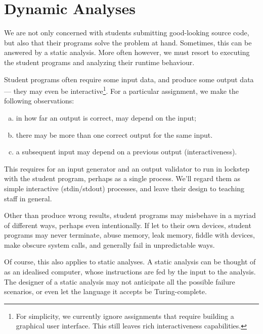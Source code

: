 
\section{Dynamic Analyses}

We are not only concerned with students submitting good-looking source code,
but also that their programs solve the problem at hand. Sometimes, this can be
answered by a static analysis. More often however, we must resort to executing
the student programs and analyzing their runtime behaviour.

Student programs often require some input data, and produce some output data
--- they may even be interactive\footnote{For simplicity, we currently ignore
assignments that require building a graphical user interface. This still leaves
rich interactiveness capabilities.}. For a particular assignment, we make the
following observations:

\begin{enumerate}[(a)]

\item in how far an output is correct, may depend on the input;

\item there may be more than one correct output for the same input.

\item a subsequent input may depend on a previous output (interactiveness).

\end{enumerate}

This requires for an input generator and an output validator to run in lockstep
with the student program, perhaps as a single process. We'll regard them as
simple interactive (stdin/stdout) processes, and leave their design to teaching
staff in general.

Other than produce wrong results, student programs may misbehave in a myriad of
different ways, perhaps even intentionally. If let to their own devices,
student programs may never terminate, abuse memory, leak memory, fiddle with
devices, make obscure system calls, and generally fail in unpredictable ways.

Of course, this also applies to static analyses. A static analysis can be
thought of as an idealised computer, whose instructions are fed by the input to
the analysis. The designer of a static analysis may not anticipate all the
possible failure scenarios, or even let the language it accepts be
Turing-complete.

